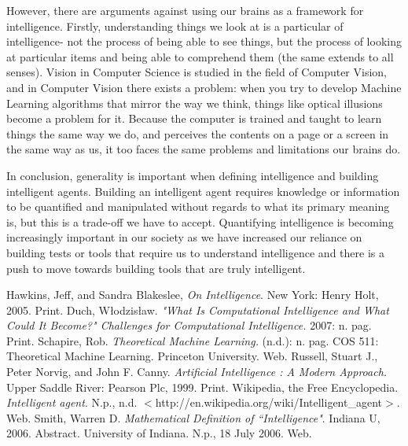 \documentclass[11pt, oneside]{article}
\begin{document}
\par However, there are arguments against using our brains as a framework for intelligence. Firstly, understanding things we look at is a particular of intelligence- not the process of being able to see things, but the process of looking at particular items and being able to comprehend them (the same extends to all senses). Vision in Computer Science is studied in the field of Computer Vision, and in Computer Vision there exists a problem: when you try to develop Machine Learning algorithms that mirror the way we think, things like optical illusions become a problem for it. Because the computer is trained and taught to learn things the same way we do, and perceives the contents on a page or a screen in the same way as us, it too faces the same problems and limitations our brains do. 

\par In conclusion, generality is important when defining intelligence and building intelligent agents. Building an intelligent agent requires knowledge or information to be quantified and manipulated without regards to what its primary meaning is, but this is a trade-off we have to accept. Quantifying intelligence is becoming increasingly important in our society as we have increased our reliance on building tests or tools that require us to understand intelligence and there is a push to move towards building tools that are truly intelligent.

\begin{thebibliography}{9}
	Hawkins, Jeff, and Sandra Blakeslee,
	\emph{On Intelligence}.
	New York: Henry Holt, 2005.
	Print.
	Duch, W\l{}odzis\l{}aw.
	\emph{"What Is Computational Intelligence and What Could It Become?" Challenges for Computational Intelligence.}
	2007: n. pag. Print.
	Schapire, Rob. 
	\emph{Theoretical Machine Learning.} 
	(n.d.): n. pag. COS 511: Theoretical Machine Learning. Princeton University. 
	Web.
	Russell, Stuart J., Peter Norvig, and John F. Canny. 
	\emph{Artificial Intelligence : A Modern Approach.}
	Upper Saddle River: Pearson Plc, 1999. Print.
	Wikipedia, the Free Encyclopedia. 
	\emph{Intelligent agent}.
	N.p., n.d. $<$http://en.wikipedia.org/wiki/Intelligent\_agent$>$.
	Web.
	Smith, Warren D. 
	\emph{Mathematical Definition of ``Intelligence"}.
	Indiana U, 2006. Abstract. University of Indiana. N.p., 18 July 2006. 
	Web.
\end{thebibliography}
\end{document}

